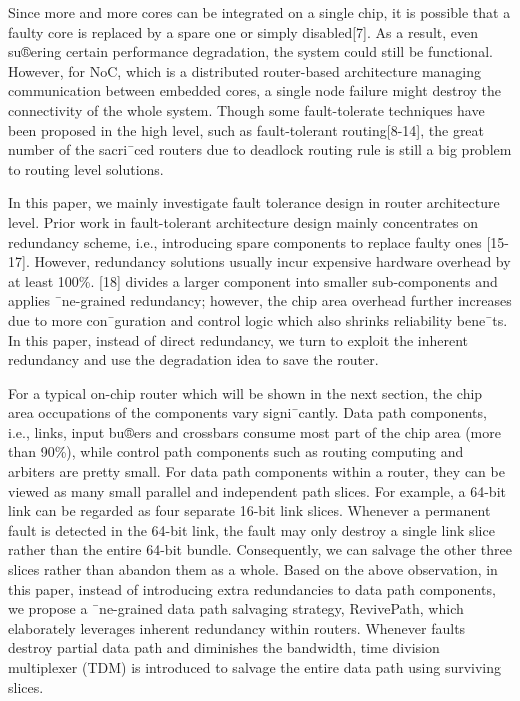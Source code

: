 Since more and more cores can be integrated on a single chip, it is possible that a faulty core is replaced by a spare one or simply disabled[7]. As a result, even su®ering certain performance degradation, the system could still be functional. However, for NoC, which is a distributed router-based architecture managing communication between embedded cores, a single node failure might destroy the connectivity of the whole system. Though some fault-tolerate techniques have been proposed in the high level, such as fault-tolerant routing[8-14], the great number of the sacri¯ced routers due to deadlock routing rule is still a big problem to routing level solutions.

In this paper, we mainly investigate fault tolerance design in router architecture level. Prior work in fault-tolerant architecture design mainly concentrates on redundancy scheme, i.e., introducing spare components to replace faulty ones [15-17]. However, redundancy solutions usually incur expensive hardware overhead by at least 100\%. [18] divides a larger component into smaller sub-components and applies ¯ne-grained redundancy; however, the chip area overhead further increases due to
more con¯guration and control logic which also shrinks reliability bene¯ts. In this paper, instead of direct redundancy, we turn to exploit the inherent redundancy and use the degradation idea to save the router. 

For a typical on-chip router which will be shown in the next section, the chip area occupations of the components vary signi¯cantly. Data path components, i.e., links, input bu®ers and crossbars consume most part of the chip area (more than 90\%), while control path components such as routing computing and arbiters are pretty small. For data path components within a router, they can be viewed as many small parallel and independent path slices. For example, a 64-bit link can be regarded as four separate 16-bit link slices. Whenever a permanent fault is detected in the 64-bit link, the fault may only destroy a single link slice rather than the entire 64-bit bundle. Consequently, we can salvage the other three slices rather than abandon them as a whole. Based on the above observation, in this paper, instead of introducing extra redundancies to data path components, we propose a ¯ne-grained data path salvaging strategy, RevivePath, which elaborately leverages inherent redundancy within routers. Whenever faults destroy partial data path and diminishes the bandwidth, time division multiplexer (TDM) is introduced to salvage the entire data path using surviving slices.

